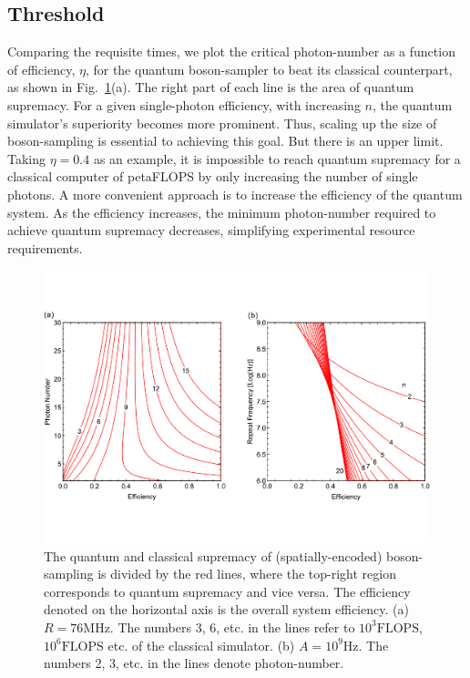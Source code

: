 \documentclass[aps,rmp,twocolumn,amsmath,amssymb,nofootinbib,superscriptaddress]{revtex4}
\begin{document}
\subsection{Threshold}

Comparing the requisite times, we plot the critical photon-number as a function of efficiency, $\eta$, for the quantum boson-sampler to beat its classical counterpart, as shown in Fig.~\ref{fig:curves_1}(a). The right part of each line is the area of quantum supremacy. For a given single-photon efficiency, with increasing $n$, the quantum simulator's superiority becomes more prominent. Thus, scaling up the size of boson-sampling is essential to achieving this goal. But there is an upper limit. Taking \mbox{$\eta=0.4$} as an example, it is impossible to reach quantum supremacy for a classical computer of petaFLOPS by only increasing the number of single photons. A more convenient approach is to increase the efficiency of the quantum system. As the efficiency increases, the minimum photon-number required to achieve quantum supremacy decreases, simplifying experimental resource requirements.

\begin{figure}[!htb]
\includegraphics[width=\columnwidth]{curves_1}
\caption{The quantum and classical supremacy of (spatially-encoded) boson-sampling is divided by the red lines, where the top-right region corresponds to quantum supremacy and vice versa. The efficiency denoted on the horizontal axis is the overall system efficiency. (a) $R=76$MHz. The numbers 3, 6, etc. in the lines refer to $10^3\mathrm{FLOPS}$, $10^6\mathrm{FLOPS}$ etc. of the classical simulator. (b) $A=10^9\mathrm{Hz}$. The numbers 2, 3, etc. in the lines denote photon-number.} \label{fig:curves_1}
\end{figure}
\end{document}
